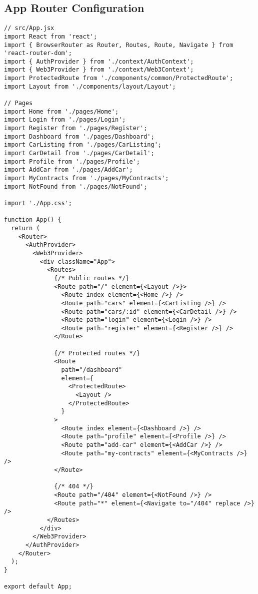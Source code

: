 \documentclass[12pt,a4paper]{article}
\begin{document}
\subsection{App Router Configuration}
\begin{lstlisting}[caption=React Router Setup]
// src/App.jsx
import React from 'react';
import { BrowserRouter as Router, Routes, Route, Navigate } from 'react-router-dom';
import { AuthProvider } from './context/AuthContext';
import { Web3Provider } from './context/Web3Context';
import ProtectedRoute from './components/common/ProtectedRoute';
import Layout from './components/layout/Layout';

// Pages
import Home from './pages/Home';
import Login from './pages/Login';
import Register from './pages/Register';
import Dashboard from './pages/Dashboard';
import CarListing from './pages/CarListing';
import CarDetail from './pages/CarDetail';
import Profile from './pages/Profile';
import AddCar from './pages/AddCar';
import MyContracts from './pages/MyContracts';
import NotFound from './pages/NotFound';

import './App.css';

function App() {
  return (
    <Router>
      <AuthProvider>
        <Web3Provider>
          <div className="App">
            <Routes>
              {/* Public routes */}
              <Route path="/" element={<Layout />}>
                <Route index element={<Home />} />
                <Route path="cars" element={<CarListing />} />
                <Route path="cars/:id" element={<CarDetail />} />
                <Route path="login" element={<Login />} />
                <Route path="register" element={<Register />} />
              </Route>

              {/* Protected routes */}
              <Route 
                path="/dashboard" 
                element={
                  <ProtectedRoute>
                    <Layout />
                  </ProtectedRoute>
                }
              >
                <Route index element={<Dashboard />} />
                <Route path="profile" element={<Profile />} />
                <Route path="add-car" element={<AddCar />} />
                <Route path="my-contracts" element={<MyContracts />} />
              </Route>

              {/* 404 */}
              <Route path="/404" element={<NotFound />} />
              <Route path="*" element={<Navigate to="/404" replace />} />
            </Routes>
          </div>
        </Web3Provider>
      </AuthProvider>
    </Router>
  );
}

export default App;
\end{lstlisting}
\end{document}
